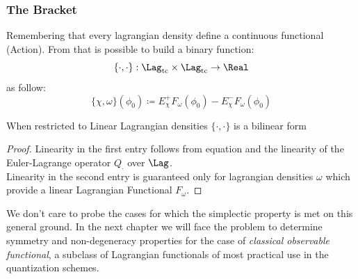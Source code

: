 \documentclass[Main]{subfiles}
\begin{document}
		\subsubsection{The Bracket}
		Remembering that every lagrangian density define a continuous functional (Action).
		From that is possible to build a binary function:
		\begin{displaymath}
			\{\cdot,\cdot\}:\Lag_{\textrm{tc}} \times \Lag_{\textrm{tc}} \rightarrow \Real 	
		\end{displaymath}
		as follow:
		\begin{equation}\label{AbstractPeierlsBracket}
				\{\chi, \omega \}(\phi_0) \coloneqq E_\chi^+ F_\omega (\phi_0) - E_\chi^- F_\omega(\phi_0)
		\end{equation}

		\begin{proposition}[Bilinearity]
			When restricted to Linear Lagrangian densities $\{\cdot,\cdot\}$ is a bilinear form
		\end{proposition}
		\begin{proof}
			Linearity in the first entry follows from equation \cite{Perturbation} and the linearity of the Euler-Lagrange operator $Q_\cdot$ over $\Lag$.
			\\
			Linearity in the second entry is guaranteed only for lagrangian densities $\omega$ which provide a linear Lagrangian Functional $F_\omega$.
		\end{proof}
		We don't care to probe the cases for which the simplectic property is met on this general ground. 
		In the next chapter we will face the problem to determine  symmetry and non-degeneracy properties for the case of  \emph{classical observable functional}, a subclass of Lagrangian functionals of most practical use in the quantization schemes.
\end{document}
